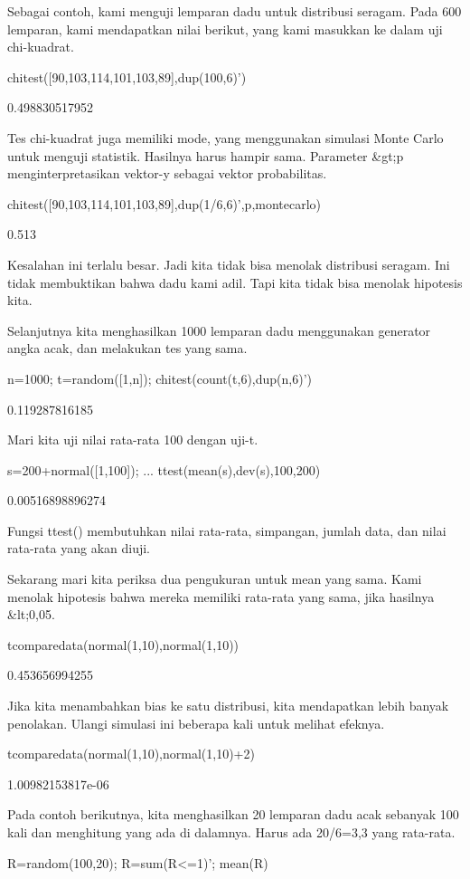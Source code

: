 \documentclass{article}
\begin{document}
Sebagai contoh, kami menguji lemparan dadu untuk distribusi seragam.
Pada 600 lemparan, kami mendapatkan nilai berikut, yang kami masukkan
ke dalam uji chi-kuadrat.


\>chitest([90,103,114,101,103,89],dup(100,6)')


    0.498830517952

Tes chi-kuadrat juga memiliki mode, yang menggunakan simulasi Monte
Carlo untuk menguji statistik. Hasilnya harus hampir sama. Parameter
&gt;p menginterpretasikan vektor-y sebagai vektor probabilitas.


\>chitest([90,103,114,101,103,89],dup(1/6,6)',\>p,\>montecarlo)


    0.513

Kesalahan ini terlalu besar. Jadi kita tidak bisa menolak distribusi
seragam. Ini tidak membuktikan bahwa dadu kami adil. Tapi kita tidak
bisa menolak hipotesis kita.


Selanjutnya kita menghasilkan 1000 lemparan dadu menggunakan generator
angka acak, dan melakukan tes yang sama.


\>n=1000; t=random([1,n]); chitest(count(t,6),dup(n,6)')


    0.119287816185

Mari kita uji nilai rata-rata 100 dengan uji-t.


\>s=200+normal([1,100]); ...  
\>   ttest(mean(s),dev(s),100,200)


    0.00516898896274

Fungsi ttest() membutuhkan nilai rata-rata, simpangan, jumlah data,
dan nilai rata-rata yang akan diuji.


Sekarang mari kita periksa dua pengukuran untuk mean yang sama. Kami
menolak hipotesis bahwa mereka memiliki rata-rata yang sama, jika
hasilnya &lt;0,05.


\>tcomparedata(normal(1,10),normal(1,10))


    0.453656994255

Jika kita menambahkan bias ke satu distribusi, kita mendapatkan lebih
banyak penolakan. Ulangi simulasi ini beberapa kali untuk melihat
efeknya.


\>tcomparedata(normal(1,10),normal(1,10)+2)


    1.00982153817e-06

Pada contoh berikutnya, kita menghasilkan 20 lemparan dadu acak
sebanyak 100 kali dan menghitung yang ada di dalamnya. Harus ada
20/6=3,3 yang rata-rata.


\>R=random(100,20); R=sum(R<=1)'; mean(R)
\end{document}
